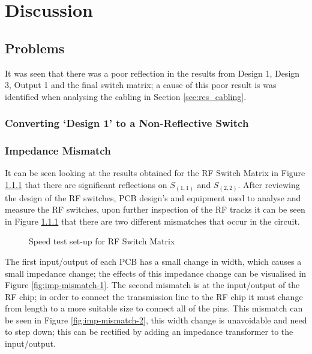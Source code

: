\documentclass[12pt,openany,a4paper]{book}
\begin{document}
\chapter{Discussion}
\section{Problems}
It was seen that there was a poor reflection in the results from Design 1, Design 3, Output 1 and the final switch matrix; a cause of this poor result is was identified when analysing the cabling in Section \ref{sec:res_cabling}. 





\subsection{Converting `Design 1' to a Non-Reflective Switch}






%		
\subsection{Impedance Mismatch}	\label{sec:imp-mismatch}
It can be seen looking at the results obtained for the RF Switch Matrix in Figure \ref{} that there are significant reflections on $S_{(1,1)}$ and $S_{(2,2)}$. After reviewing the design of the RF switches, PCB design's and equipment used to analyse and measure the RF switches, upon further inspection of the RF tracks it can be seen in Figure \ref{} that there are two different mismatches that occur in the circuit.
\begin{figure}[H]
	\centering
	\caption{Speed test set-up for RF Switch Matrix}
	\label{fig:speedtest}
\end{figure} 
The first input/output of each PCB has a small change in width, which causes a small impedance change; the effects of this impedance change can be visualised in Figure \ref{fig:imp-mismatch-1}. The second mismatch is at the input/output of the RF chip; in order to connect the transmission line to the RF chip it must change from length to a more suitable size to connect all of the pins. This mismatch can be seen in Figure \ref{fig:imp-mismatch-2}, this width change is unavoidable and need to step down; this can be rectified by adding an impedance transformer to the input/output.
\end{document}
